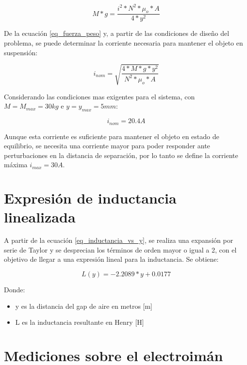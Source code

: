 \begin{equation}\label{eq_fuerza_peso}
	M*g=\frac{i^{2}*N^{2}*\mu_{o}*A}{4*y^{2}}
\end{equation}

\noindent De la ecuación \ref{eq_fuerza_peso} y, a partir de las condiciones de diseño del problema, se puede determinar la corriente necesaria para mantener el objeto en suspensión:

\begin{equation} \label{eq_corriente_peso}
	i_{nom}=\sqrt{\frac{4*M*g*y^{2}}{N^{2}*\mu_{o}*A}}
\end{equation}

Considerando las condiciones mas exigentes para el sistema, con $M=M_{max}=30kg$ e $y=y_{max}=5mm$:

\begin{equation}
	i_{nom}=20.4A
\end{equation}

\noindent Aunque esta corriente es suficiente para mantener el objeto en estado de equilibrio, se necesita una corriente mayor para poder responder ante perturbaciones en la distancia de separación, por lo tanto se define la corriente máxima $i_{max}=30A$.



\section{Expresión de inductancia linealizada}

\noindent A partir de la ecuación \ref{eq_inductancia_vs_y}, se realiza una expansión por serie de Taylor y se desprecian los términos de orden mayor o igual a 2, con el objetivo de llegar a una expresión lineal para la inductancia. Se obtiene:

\begin{equation} \label{eq_inductancia_lineal_teorica}
	L(y)=-2.2089*y+0.0177
\end{equation}

\noindent Donde:
\begin{itemize}
	\item y es la distancia del gap de aire en metros [m]
	\item L es la inductancia resultante en Henry [H]
\end{itemize}

\section{Mediciones sobre el electroimán}

